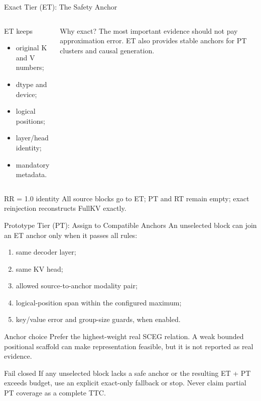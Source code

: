 \documentclass[aspectratio=169,10pt]{beamer}
\newcommand{\tightitems}{\setlength{\itemsep}{0.28em}\setlength{\parskip}{0pt}}
\begin{document}
\begin{frame}{Exact Tier (ET): The Safety Anchor}
\small
\begin{columns}[T,onlytextwidth]
\begin{block}{ET keeps}
\begin{itemize}\tightitems
  \item original K and V numbers;
  \item dtype and device;
  \item logical positions;
  \item layer/head identity;
  \item mandatory metadata.
\end{itemize}
\end{block}
\begin{exampleblock}{Why exact?}
The most important evidence should not pay approximation error. ET also provides stable anchors
for PT clusters and causal generation.
\end{exampleblock}
\end{columns}
\begin{alertblock}{RR = 1.0 identity}
All source blocks go to ET; PT and RT remain empty; exact reinjection reconstructs FullKV exactly.
\end{alertblock}
\end{frame}

\begin{frame}{Prototype Tier (PT): Assign to Compatible Anchors}
\small
An unselected block can join an ET anchor only when it passes all rules:
\begin{enumerate}\tightitems
  \item same decoder layer;
  \item same KV head;
  \item allowed source-to-anchor modality pair;
  \item logical-position span within the configured maximum;
  \item key/value error and group-size guards, when enabled.
\end{enumerate}
\begin{block}{Anchor choice}
Prefer the highest-weight real SCEG relation. A weak bounded positional scaffold can make
representation feasible, but it is not reported as real evidence.
\end{block}
\begin{alertblock}{Fail closed}
If any unselected block lacks a safe anchor or the resulting ET + PT exceeds budget, use an
explicit exact-only fallback or stop. Never claim partial PT coverage as a complete TTC.
\end{alertblock}
\end{frame}
\end{document}
